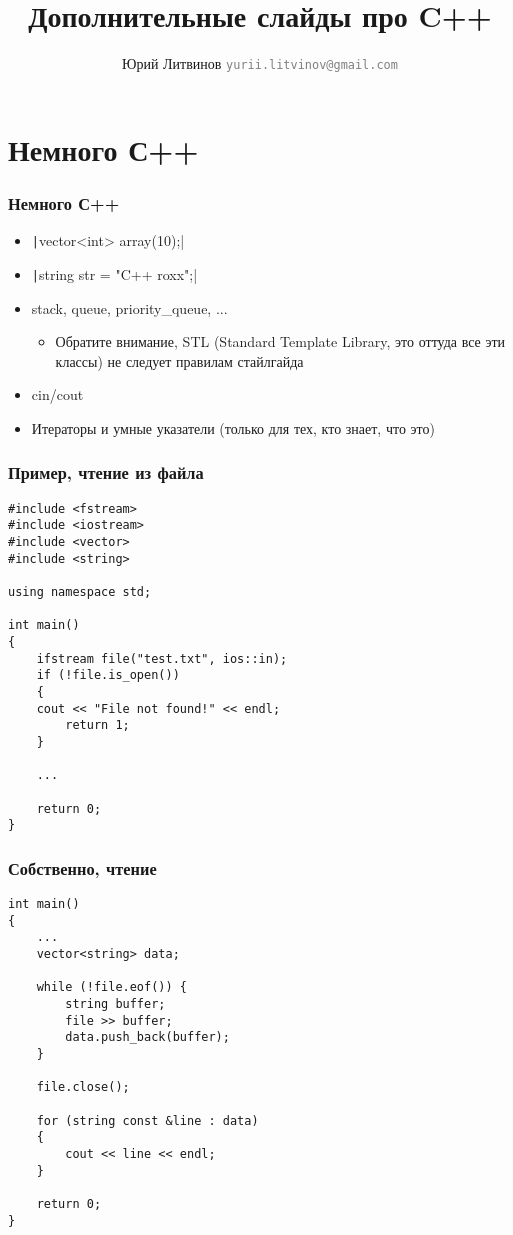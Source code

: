 \documentclass[xetex,mathserif,serif]{beamer}
\title{Дополнительные  слайды про C++}
\author[Юрий Литвинов]{Юрий Литвинов \newline \textcolor{gray}{\small\texttt{yurii.litvinov@gmail.com}}}
\date{}
\begin{document}
	
	\frame{\titlepage}
	
	\section{Немного С++}

	\begin{frame}
		\frametitle{Немного С++}
		\begin{itemize}
			\item \texttt|vector<int> array(10);|
			\item \texttt|string str = "C++ roxx";|
			\item stack, queue, priority\_queue, ...
			\begin{itemize}
				\item Обратите внимание, STL (Standard Template Library, это оттуда все эти классы) не следует правилам стайлгайда
			\end{itemize}
			\item cin/cout
			\item Итераторы и умные указатели (только для тех, кто знает, что это)
		\end{itemize}
	\end{frame}

	\begin{frame}[fragile]
		\frametitle{Пример, чтение из файла}
		\begin{scriptsize}
			\begin{verbatim}
#include <fstream>
#include <iostream>
#include <vector>
#include <string>

using namespace std;

int main()
{
    ifstream file("test.txt", ios::in);
    if (!file.is_open()) 
    {
    cout << "File not found!" << endl;
        return 1;
    }

    ...

    return 0;
}
			\end{verbatim}
		\end{scriptsize}
	\end{frame}

	\begin{frame}[fragile]
		\frametitle{Собственно, чтение}
		\begin{scriptsize}
			\begin{verbatim}
int main()
{
    ...
    vector<string> data;

    while (!file.eof()) {
        string buffer;
        file >> buffer;
        data.push_back(buffer);
    }

    file.close();

    for (string const &line : data) 
    {
        cout << line << endl;
    }

    return 0;
}
			\end{verbatim}
		\end{scriptsize}
	\end{frame}
\end{document}
